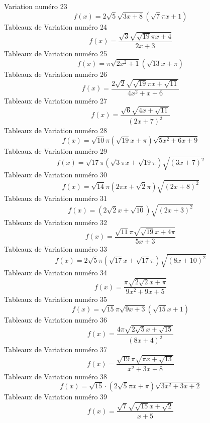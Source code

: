 \documentclass{article}
\begin{document}
Variation num\'ero 23 \[f(x) = 2 \sqrt{5} \sqrt{3 x + 8} \left(\sqrt{7} \pi x + 1\right)\]Tableaux de Variation num\'ero 24 \[f(x) = \frac{\sqrt{3} \sqrt{\sqrt{19} \pi x + 4}}{2 x + 3}\]Tableaux de Variation num\'ero 25 \[f(x) = \pi \sqrt{2 x^{2} + 1} \left(\sqrt{13} x + \pi\right)\]Tableaux de Variation num\'ero 26 \[f(x) = \frac{2 \sqrt{2} \sqrt{\sqrt{19} \pi x + \sqrt{11}}}{4 x^{2} + x + 6}\]Tableaux de Variation num\'ero 27 \[f(x) = \frac{\sqrt{6} \sqrt{4 x + \sqrt{11}}}{\left(2 x + 7\right)^{2}}\]Tableaux de Variation num\'ero 28 \[f(x) = \sqrt{10} \pi \left(\sqrt{19} x + \pi\right) \sqrt{5 x^{2} + 6 x + 9}\]Tableaux de Variation num\'ero 29 \[f(x) = \sqrt{17} \pi \left(\sqrt{3} \pi x + \sqrt{19} \pi\right) \sqrt{\left(3 x + 7\right)^{2}}\]Tableaux de Variation num\'ero 30 \[f(x) = \sqrt{14} \pi \left(2 \pi x + \sqrt{2} \pi\right) \sqrt{\left(2 x + 8\right)^{2}}\]Tableaux de Variation num\'ero 31 \[f(x) = \left(2 \sqrt{2} x + \sqrt{10}\right) \sqrt{\left(2 x + 3\right)^{2}}\]Tableaux de Variation num\'ero 32 \[f(x) = \frac{\sqrt{11} \pi \sqrt{\sqrt{19} x + 4 \pi}}{5 x + 3}\]Tableaux de Variation num\'ero 33 \[f(x) = 2 \sqrt{5} \pi \left(\sqrt{17} x + \sqrt{17} \pi\right) \sqrt{\left(8 x + 10\right)^{2}}\]Tableaux de Variation num\'ero 34 \[f(x) = \frac{\pi \sqrt{2 \sqrt{2} x + \pi}}{9 x^{2} + 9 x + 5}\]Tableaux de Variation num\'ero 35 \[f(x) = \sqrt{15} \pi \sqrt{9 x + 3} \left(\sqrt{15} x + 1\right)\]Tableaux de Variation num\'ero 36 \[f(x) = \frac{4 \pi \sqrt{2 \sqrt{5} x + \sqrt{15}}}{\left(8 x + 4\right)^{2}}\]Tableaux de Variation num\'ero 37 \[f(x) = \frac{\sqrt{19} \pi \sqrt{\pi x + \sqrt{13}}}{x^{2} + 3 x + 8}\]Tableaux de Variation num\'ero 38 \[f(x) = \sqrt{15} \cdot \left(2 \sqrt{5} \pi x + \pi\right) \sqrt{3 x^{2} + 3 x + 2}\]Tableaux de Variation num\'ero 39 \[f(x) = \frac{\sqrt{7} \sqrt{\sqrt{15} x + \sqrt{2}}}{x + 5}\]
\end{document}

